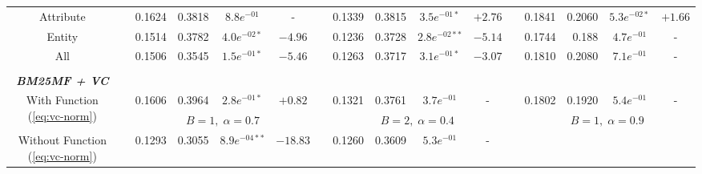 \begin{table*}
{\begin{tabular}{cc@{\hs}rrccc@{\hs}rrccc@{\hs}rrcc}
{\raggedright Attribute} & \phantom{a} & 0.1624 & 0.3818 & $8.8e^{-01}$ & -
                         & \phantom{a} & 0.1339 & 0.3815 & $3.5e^{-01*}$ & $+2.76$
                         & \phantom{a} & 0.1841 & 0.2060 & $5.3e^{-02*}$ & $+1.66$ \\
{\raggedright Entity} & \phantom{a} & 0.1514 & 0.3782 & $4.0e^{-02*}$ & $-4.96$
                      & \phantom{a} & 0.1236 & 0.3728 & $2.8e^{-02**}$ & $-5.14$
                      & \phantom{a} & 0.1744 & 0.188 & $4.7e^{-01}$ & - \\
{\raggedright All} & \phantom{a} & 0.1506 & 0.3545 & $1.5e^{-01*}$ & $-5.46$
                   & \phantom{a} & 0.1263 & 0.3717 & $3.1e^{-01*}$ & $-3.07$
                   & \phantom{a} & 0.1810 & 0.2080 & $7.1e^{-01}$ & - \\
\\
\emph{\textbf{BM25MF + VC}} & \multicolumn{15}{c}{\phantom{a}} \\
\multirow{2}{*}{{\raggedright With Function (\ref{eq:vc-norm})}} & \phantom{a} & 0.1606 & 0.3964 & $2.8e^{-01*}$ & $+0.82$
                                                                 & \phantom{a} & 0.1321 & 0.3761 & $3.7e^{-01}$ & -
                                                                 & \phantom{a} & 0.1802 & 0.1920 & $5.4e^{-01}$ & - \\
 & \phantom{a} & \multicolumn{4}{c}{$B=1,\;\alpha=0.7$}
   & \phantom{a} & \multicolumn{4}{c}{$B=2,\;\alpha=0.4$}
   & \phantom{a} & \multicolumn{4}{c}{$B=1,\;\alpha=0.9$} \\
{\raggedright Without Function (\ref{eq:vc-norm})} & \phantom{a} & 0.1293 & 0.3055 & $8.9e^{-04**}$ & $-18.83$
                                                   & \phantom{a} & 0.1260 & 0.3609 & $5.3e^{-01}$ & -

\end{tabular}}
\end{table*}

